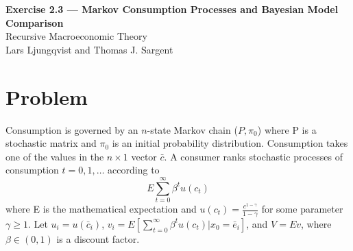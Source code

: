 \documentclass[11pt]{article}
\begin{document}
\begin{center}
    {\LARGE \textbf{Exercise 2.3 — Markov Consumption Processes and Bayesian Model Comparison}}\\[0.5em]
    {\large Recursive Macroeconomic Theory}\\[0.25em]
    {\normalsize Lars Ljungqvist and Thomas J. Sargent}
\end{center}

\vspace{1em}

\section*{Problem}

Consumption is governed by an \(n\)-state Markov chain (\(P,\pi_0\)) where P is a stochastic matrix and \(\pi_0\) is an initial probability distribution. Consumption takes one of the values in the \(n\times1\) vector \(\bar{c}\). A consumer ranks stochastic processes of consumption \(t=0,1,\dots\) according to
\[
E\sum_{t=0}^\infty \beta^tu(c_t)
\]
where E is the mathematical expectation and \(u(c_t)=\frac{c^{1-\gamma}}{1-\gamma}\) for some parameter \(\gamma\geq1.\) Let \(u_i=u(\bar{c}_i)\), \(v_i=E[\sum_{t=0}^\infty\beta^tu(c_t)|x_0=\bar{e}_i]\), and \(V=Ev\), where \(\beta\in(0,1)\) is a discount factor. 
\end{document}
